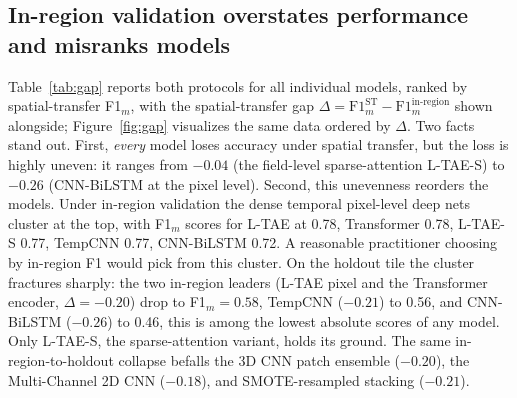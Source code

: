 \documentclass[pdflatex,sn-mathphys]{sn-jnl} %
\begin{document}
\subsection{In-region validation overstates performance and misranks models}

Table~\ref{tab:gap} reports both protocols for all individual models, ranked by
spatial-transfer F1$_m$, with the spatial-transfer gap
$\Delta = \text{F1}_m^{\text{ST}} - \text{F1}_m^{\text{in-region}}$ shown alongside;
Figure~\ref{fig:gap} visualizes the same data ordered by $\Delta$. Two facts stand out. First, \emph{every}
model loses accuracy under spatial transfer, but the loss is highly uneven: it ranges from
$-0.04$ (the field-level sparse-attention L-TAE-S) to $-0.26$ (CNN-BiLSTM at the pixel level).
Second, this unevenness reorders the models. Under in-region validation the dense temporal
pixel-level deep nets cluster at the top, with F1$_m$ scores for L-TAE at 0.78, Transformer 0.78, L-TAE-S 0.77,
TempCNN 0.77, CNN-BiLSTM 0.72. A reasonable practitioner choosing by in-region F1 would pick
from this cluster. On the holdout tile the cluster fractures sharply: the two in-region
leaders (L-TAE pixel and the Transformer encoder, $\Delta=-0.20$) drop to F1$_m=0.58$,
TempCNN ($-0.21$) to 0.56, and CNN-BiLSTM ($-0.26$) to 0.46, this is among the lowest absolute
scores of any model. Only L-TAE-S, the sparse-attention variant, holds its ground. The
same in-region-to-holdout collapse befalls the 3D CNN patch ensemble ($-0.20$), the
Multi-Channel 2D CNN ($-0.18$), and SMOTE-resampled stacking ($-0.21$).
\end{document}
